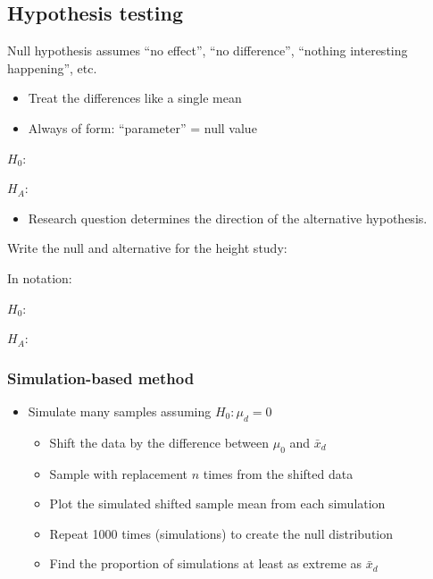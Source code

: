 \documentclass[
]{report}
\providecommand{\tightlist}{%
  \setlength{\itemsep}{0pt}\setlength{\parskip}{0pt}}
\begin{document}
\vspace{0.5in}

\subsection*{Hypothesis testing}\label{hypothesis-testing}

Null hypothesis assumes ``no effect'', ``no difference'', ``nothing interesting happening'', etc.

\begin{itemize}
\item
  Treat the differences like a single mean
\item
  Always of form: ``parameter'' = null value
\end{itemize}

\(H_0:\)

\vspace{0.2in}

\(H_A:\)

\vspace{0.2in}

\begin{itemize}
\tightlist
\item
  Research question determines the direction of the alternative hypothesis.
\end{itemize}

Write the null and alternative for the height study:

In notation:

\(H_0:\)

\vspace{0.2in}

\(H_A:\)

\vspace{0.2in}

\subsubsection*{Simulation-based method}\label{simulation-based-method}

\begin{itemize}
\item
  Simulate many samples assuming \(H_0: \mu_d = 0\)

  \begin{itemize}
  \item
    Shift the data by the difference between \(\mu_0\) and \(\bar{x}_d\)
  \item
    Sample with replacement \(n\) times from the shifted data
  \item
    Plot the simulated shifted sample mean from each simulation
  \item
    Repeat 1000 times (simulations) to create the null distribution
  \item
    Find the proportion of simulations at least as extreme as \(\bar{x}_d\)
  \end{itemize}
\end{itemize}
\end{document}
